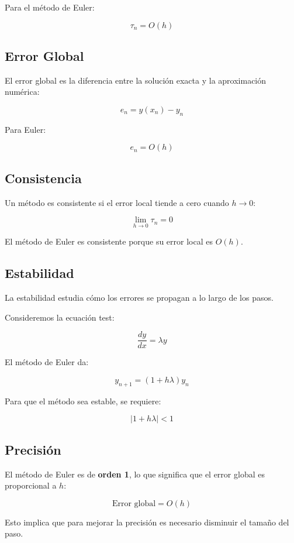 \documentclass[12pt,a4paper]{article}
\begin{document}
Para el método de Euler:

\begin{equation}
\tau_n = O(h)
\end{equation}

\subsection{Error Global}

El error global es la diferencia entre la solución exacta y la aproximación numérica:

\begin{equation}
e_n = y(x_n) - y_n
\end{equation}

Para Euler:

\begin{equation}
e_n = O(h)
\end{equation}

\subsection{Consistencia}

Un método es consistente si el error local tiende a cero cuando $h \to 0$:

\begin{equation}
\lim_{h \to 0} \tau_n = 0
\end{equation}

El método de Euler es consistente porque su error local es $O(h)$.

\subsection{Estabilidad}

La estabilidad estudia cómo los errores se propagan a lo largo de los pasos.

Consideremos la ecuación test:

\begin{equation}
\frac{dy}{dx} = \lambda y
\end{equation}

El método de Euler da:

\begin{equation}
y_{n+1} = (1 + h\lambda) y_n
\end{equation}

Para que el método sea estable, se requiere:

\begin{equation}
|1 + h\lambda| < 1
\end{equation}

\subsection{Precisión}

El método de Euler es de \textbf{orden 1}, lo que significa que el error global es proporcional a $h$:

\begin{equation}
\text{Error global} = O(h)
\end{equation}

Esto implica que para mejorar la precisión es necesario disminuir el tamaño del paso.
\end{document}
